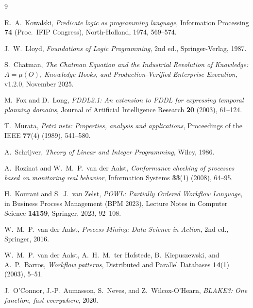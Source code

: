 \documentclass[11pt,oneside]{book}
\theoremstyle{definition}
\theoremstyle{plain}
\theoremstyle{remark}
\begin{document}
\begin{thebibliography}{9}

R.~A.~Kowalski,
\emph{Predicate logic as programming language},
Information Processing \textbf{74} (Proc.\ IFIP Congress), North-Holland, 1974, 569--574.

J.~W.~Lloyd,
\emph{Foundations of Logic Programming},
2nd ed., Springer-Verlag, 1987.

S.~Chatman,
\emph{The Chatman Equation and the Industrial Revolution of Knowledge:
$A=\mu(O)$, Knowledge Hooks, and Production-Verified Enterprise Execution},
v1.2.0, November 2025.

M.~Fox and D.~Long,
\emph{PDDL2.1: An extension to PDDL for expressing temporal planning domains},
Journal of Artificial Intelligence Research \textbf{20} (2003), 61--124.

T.~Murata,
\emph{Petri nets: Properties, analysis and applications},
Proceedings of the IEEE \textbf{77}(4) (1989), 541--580.

A.~Schrijver,
\emph{Theory of Linear and Integer Programming},
Wiley, 1986.

A.~Rozinat and W.~M.~P.~van der Aalst,
\emph{Conformance checking of processes based on monitoring real behavior},
Information Systems \textbf{33}(1) (2008), 64--95.

H.~Kourani and S.~J.~van Zelst,
\emph{POWL: Partially Ordered Workflow Language},
in Business Process Management (BPM 2023), Lecture Notes in Computer Science \textbf{14159},
Springer, 2023, 92--108.

W.~M.~P.~van der Aalst,
\emph{Process Mining: Data Science in Action},
2nd ed., Springer, 2016.

W.~M.~P.~van der Aalst, A.~H.~M.~ter Hofstede, B.~Kiepuszewski, and A.~P.~Barros,
\emph{Workflow patterns},
Distributed and Parallel Databases \textbf{14}(1) (2003), 5--51.

J.~O'Connor, J.-P.~Aumasson, S.~Neves, and Z.~Wilcox-O'Hearn,
\emph{BLAKE3: One function, fast everywhere},
2020.

\end{thebibliography}
\end{document}
